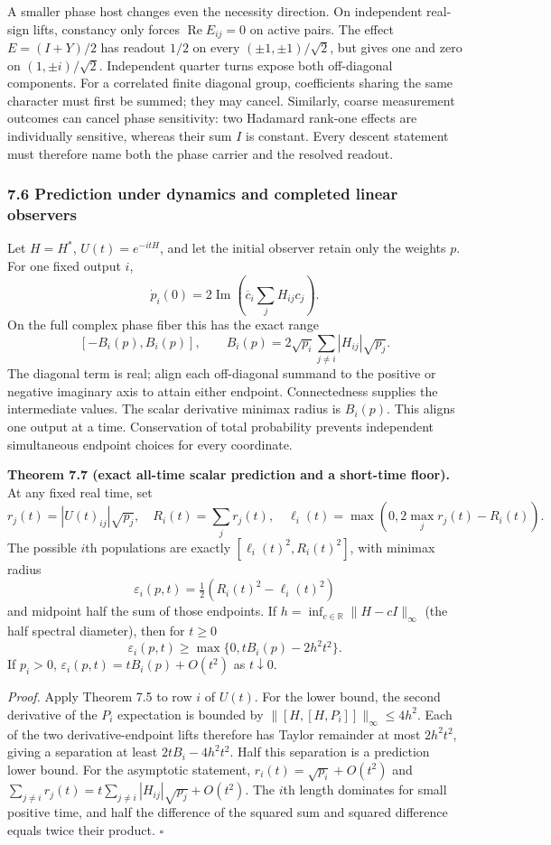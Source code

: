 \documentclass[
  11pt,
]{article}
\begin{document}
A smaller phase host changes even the necessity direction. On independent
real-sign lifts, constancy only forces \(\operatorname{Re}E_{ij}=0\) on active
pairs. The effect \(E=(I+Y)/2\) has readout \(1/2\) on every
\((\pm1,\pm1)/\sqrt2\), but gives one and zero on \((1,\pm i)/\sqrt2\).
Independent quarter turns expose both off-diagonal components. For a correlated
finite diagonal group, coefficients sharing the same character must first be
summed; they may cancel. Similarly, coarse measurement outcomes can cancel
phase sensitivity: two Hadamard rank-one effects are individually sensitive,
whereas their sum \(I\) is constant. Every descent statement must therefore
name both the phase carrier and the resolved readout.

\subsubsection{7.6 Prediction under dynamics and completed linear observers}\label{prediction-under-dynamics-and-completed-linear-observers}

Let \(H=H^*\), \(U(t)=e^{-itH}\), and let the initial observer retain only the
weights \(p\). For one fixed output \(i\),
\[
\dot p_i(0)=2\operatorname{Im}\left(\overline c_i\sum_jH_{ij}c_j\right).
\]
On the full complex phase fiber this has the exact range
\[
[-B_i(p),B_i(p)],\qquad
 B_i(p)=2\sqrt{p_i}\sum_{j\ne i}|H_{ij}|\sqrt{p_j}.
\]
The diagonal term is real; align each off-diagonal summand to the positive or
negative imaginary axis to attain either endpoint. Connectedness supplies the
intermediate values. The scalar derivative minimax radius is \(B_i(p)\).
This aligns one output at a time. Conservation of total probability prevents
independent simultaneous endpoint choices for every coordinate.

\textbf{Theorem 7.7 (exact all-time scalar prediction and a short-time floor).} At
any fixed real time, set
\[
r_j(t)=|U(t)_{ij}|\sqrt{p_j},\quad R_i(t)=\sum_jr_j(t),\quad
\ell_i(t)=\max(0,2\max_jr_j(t)-R_i(t)).
\]
The possible \(i\)th populations are exactly
\([\ell_i(t)^2,R_i(t)^2]\), with minimax radius
\[
\varepsilon_i(p,t)=\tfrac12(R_i(t)^2-\ell_i(t)^2)
\]
and midpoint half the sum of those endpoints. If
\(h=\inf_{c\in\mathbb R}\lVert H-cI\rVert_\infty\)
(the half spectral diameter), then for \(t\ge0\)
\[
\varepsilon_i(p,t)\ge\max\{0,tB_i(p)-2h^2t^2\}.
\]
If \(p_i>0\), \(\varepsilon_i(p,t)=tB_i(p)+O(t^2)\) as \(t\downarrow0\).

\emph{Proof.} Apply Theorem 7.5 to row \(i\) of \(U(t)\). For the lower bound, the
second derivative of the \(P_i\) expectation is bounded by
\(\lVert [H,[H,P_i]]\rVert_\infty\le4h^2\). Each of the two derivative-endpoint
lifts therefore has Taylor remainder at most \(2h^2t^2\), giving a separation
at least \(2tB_i-4h^2t^2\). Half this separation is a prediction lower bound.
For the asymptotic statement, \(r_i(t)=\sqrt{p_i}+O(t^2)\) and
\(\sum_{j\ne i}r_j(t)=t\sum_{j\ne i}|H_{ij}|\sqrt{p_j}+O(t^2)\).
The \(i\)th length dominates for small positive time, and half the difference
of the squared sum and squared difference equals twice their product.
\(\square\)
\end{document}
